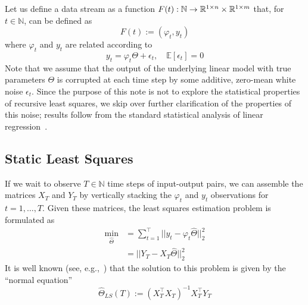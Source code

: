 Let us define a data stream as a function $F(t): \mathbb{N} \rightarrow \mathbb{R}^{1\times n} \times \mathbb{R}^{1\times m}$ that, for $t \in \mathbb{N}$,
can be defined as 
\begin{equation} 
  F(t) := (\varphi_t, y_t)
\end{equation}
where $\varphi_t$ and $y_t$ are related according to 
\begin{equation}
  y_t = \varphi_t \Theta + \epsilon_t, \quad \mathbb{E}\left[\epsilon_t\right] = 0
\end{equation} 
Note that we assume that the output of the underlying linear model with true
parameters $\Theta$ is corrupted at each time step by some additive, zero-mean
white noise $\epsilon_t$. Since the purpose of this note is not to explore the
statistical properties of recursive least squares, we skip over further
clarification of the properties of this noise; results follow from the standard
statistical analysis of linear regression~\cite{bishop2006pattern}. 

\subsection{Static Least Squares}
If we wait to observe $T \in \mathbb{N}$ time steps of input-output pairs, we can assemble the matrices $X_T$ and $Y_T$ by vertically stacking the $\varphi_t$ and $y_t$ observations for $t = 1,\ldots,T$. Given these matrices, the least squares estimation problem is formulated as
\begin{align}
  \min_{\hat\Theta} &=  \sum_{t=1}^\top ||y_t - \varphi_t\hat\Theta||_2^2\\
                    &=  ||Y_T - X_T\hat\Theta||_2^2
\end{align}
It is well known (see, e.g.,~\cite{bishop2006pattern}) that the solution to
this problem is given by the ``normal equation''
\begin{equation}
  \label{eq:theta_ls}
  \hat\Theta_{LS}(T) := \left(X_T^\top X_T\right)^{-1}X_T^\top Y_T
\end{equation}

